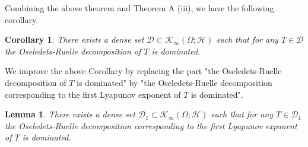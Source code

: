 \documentclass[pdflatex,sn-mathphys-num]{sn-jnl}%
\theoremstyle{thmstyleone}%
\theoremstyle{thmstyletwo}%
\newtheorem{lemma}{Lemma}
\newtheorem{corollary}{Corollary}
\theoremstyle{thmstylethree}%
\newcommand{\cK}{\mathcal{K}}
\numberwithin{equation}{section}
\begin{document}
%
%
Combining the above theorem and Theorem A (iii), we have the following corollary. 
%
\begin{corollary}\label{Corollary_Density}
 There exists a dense set $\mathcal D\subset \cK_{\infty}(\Omega;\mathcal H)$ such that for any $T\in\mathcal D$ the Oseledets-Ruelle decomposition of $T$ is dominated.
\end{corollary}
%
%
We improve the above Corollary by replacing the part "the Oseledets-Ruelle decomposition of $T$ is dominated" by "the Oseledets-Ruelle decomposition corresponding to the first Lyapunov exponent of $T$ is dominated".
%
\begin{lemma}\label{Density_FirstLemma}
There exists a dense set $\mathcal D_1\subset \cK_{\infty}(\Omega;\mathcal H)$ such that for any $T\in\mathcal D_1$  the Oseledets-Ruelle decomposition corresponding to the first Lyapunov exponent of $T$ is dominated.
\end{lemma}
\end{document}
